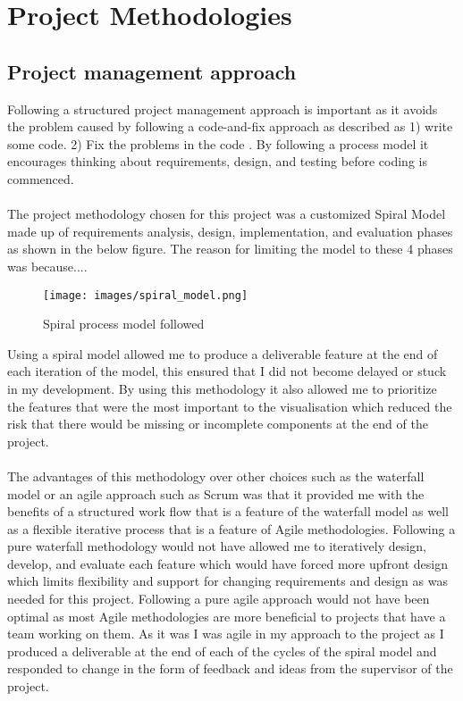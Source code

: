 
\chapter{Project Methodologies}\label{C:m}

\section{Project management approach}
Following a structured project management approach is important as it avoids the problem caused by following a code-and-fix approach as described  as 1) write some code. 2) Fix the problems in the code \cite{boehm}. By following a process model it encourages thinking about requirements, design, and testing before coding is commenced. 
\\\\
The project methodology chosen for this project was a customized Spiral Model made up of requirements analysis, design, implementation, and evaluation phases as shown in the below figure. The reason for limiting the model to these 4 phases was because....  
\begin{figure}[h!]
  \centering
      \texttt{[image: images/spiral\_model.png]}
  \caption{Spiral process model followed}
\end{figure}
Using a spiral model allowed me to produce a deliverable feature at the end of each iteration of the model, this ensured that I did not become delayed or stuck in my development. By using this methodology it also allowed me to prioritize the features that were the most important to the visualisation which reduced the risk that there would be missing or incomplete components at the end of the project. 
\\\\
The advantages of this methodology over other choices such as the waterfall model or an agile approach such as Scrum was that it provided me with the benefits of a structured work flow that is a feature of the waterfall model as well as a flexible iterative process that is a feature of Agile methodologies. Following a pure waterfall methodology would not have allowed me to iteratively design, develop, and evaluate each feature which would have forced more upfront design which limits flexibility and support for changing requirements and design as was needed for this project. Following a pure agile approach would not have been optimal as most Agile methodologies are more beneficial to projects that have a team working on them. As it was I was agile in my approach to the project as I produced a deliverable at the end of each of the cycles of the spiral model and responded to change in the form of feedback and ideas from the supervisor of the project.
